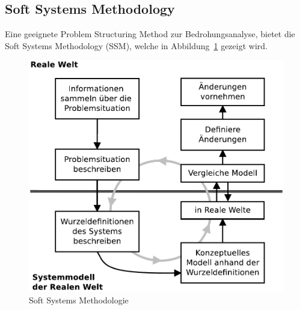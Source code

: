 \documentclass[11pt,a4paper]{report}
\begin{document}
\subsection{Soft Systems Methodology}

Eine geeignete Problem Structuring Method zur Bedrohungsanalyse, bietet die Soft Systems Methodology (SSM), welche in Abbildung~\ref{fig:ssm} gezeigt wird.

\begin{figure}[htbp]
\centering
\includegraphics[scale=0.6]{images/ssm.pdf}
\caption{Soft Systems Methodologie}
\label{fig:ssm}
\end{figure}
\end{document}
